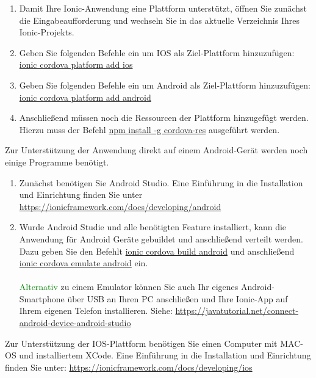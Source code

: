 \begin{enumerate}
    \item Damit Ihre Ionic-Anwendung eine Plattform unterstützt, öffnen Sie zunächst die Eingabeaufforderung und wechseln Sie in das aktuelle Verzeichnis Ihres Ionic-Projekts. 
    
    \item Geben Sie folgenden Befehle ein um IOS als Ziel-Plattform hinzuzufügen: \underline{ionic cordova platform add ios}
    \item Geben Sie folgenden Befehle ein um Android als Ziel-Plattform hinzuzufügen: \underline{ionic cordova platform add android}
    \item Anschließend müssen noch die Ressourcen der Plattform hinzugefügt werden. Hierzu muss der Befehl \underline{npm install -g cordova-res} ausgeführt werden.
    
\end{enumerate}{}
Zur Unterstützung der Anwendung direkt auf einem Android-Gerät werden noch einige Programme benötigt.

\begin{enumerate}
    \item  Zunächst benötigen Sie Android Studio. Eine Einführung in die Installation und Einrichtung finden Sie unter
    \href{https://ionicframework.com/docs/developing/android}{https://ionicframework.com/docs/developing/android}
    
    \item Wurde Android Studie und alle benötigten Feature installiert, kann die Anwendung für Android Geräte gebuildet und anschließend verteilt werden. Dazu geben Sie den Befehlt \underline{ionic cordova build android} und anschließend \underline{ionic cordova emulate android} ein.\\\\
    \textcolor{green}{Alternativ} zu einem Emulator können Sie auch Ihr eigenes Android-Smartphone über USB an Ihren PC anschließen und Ihre Ionic-App auf Ihrem eigenen Telefon installieren. Siehe: \href{https://javatutorial.net/connect-android-device-android-studio}{https://javatutorial.net/connect-android-device-android-studio}

\end{enumerate}{}
Zur Unterstützung der IOS-Plattform benötigen Sie einen Computer mit MAC-OS und installiertem XCode. Eine Einführung in die Installation und Einrichtung finden Sie unter: \href{https://ionicframework.com/docs/developing/ios}{https://ionicframework.com/docs/developing/ios}

